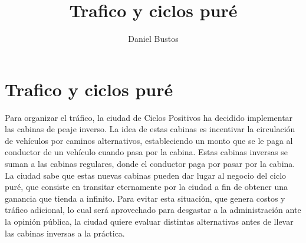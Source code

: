 \documentclass{article}
\title{Trafico y ciclos puré}
\author{Daniel Bustos}
\date{}
\begin{document}
\maketitle

\section*{Trafico y ciclos puré}

Para organizar el tráfico, la ciudad de Ciclos Positivos ha decidido implementar las cabinas de peaje inverso. La idea de estas cabinas es incentivar la circulación de vehículos por caminos alternativos, estableciendo un monto que se le paga al conductor de un vehículo cuando pasa por la cabina. Estas cabinas inversas se suman a las cabinas regulares, donde el conductor paga por pasar por la cabina. La ciudad sabe que estas nuevas cabinas pueden dar lugar al negocio del ciclo puré, que consiste en transitar eternamente por la ciudad a fin de obtener una ganancia que tienda a infinito. Para evitar esta situación, que genera costos y tráfico adicional, lo cual será aprovechado para desgastar a la administración ante la opinión pública, la ciudad quiere evaluar distintas alternativas antes de llevar las cabinas inversas a la práctica.
\end{document}
